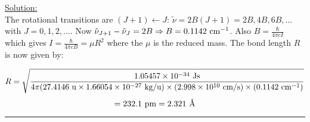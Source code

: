\noindent
\underline{Solution:}\\

\noindent
The rotational transitions are $(J+1)\leftarrow J$: $\tilde{\nu} = 2B(J+1) = 2B, 4B, 6B, ...$ with $J = 0,1,2,...$. Now $\tilde{\nu}_{J+1} - \tilde{\nu}_J = 2B \Rightarrow B = 0.1142\textnormal{ cm}^{-1}$. Also $B = \frac{\hbar}{4\pi cI}$ which gives $I = \frac{\hbar}{4\pi cB} = \mu R^2$ where the $\mu$ is the reduced mass. The bond length $R$ is now given by:

$$R = \sqrt{\frac{1.05457\times 10^{-34}\textnormal{ Js}}{4\pi(27.4146\textnormal{ u}\times 1.66054\times 10^{-27}\textnormal{ kg/u})\times(2.998\times 10^{10}\textnormal{ cm/s})\times(0.1142\textnormal{ cm}^{-1})}}$$
$$ = 232.1\textnormal{ pm} = 2.321\textnormal{ \AA}$$

\hrule\vspace{0.5cm}



